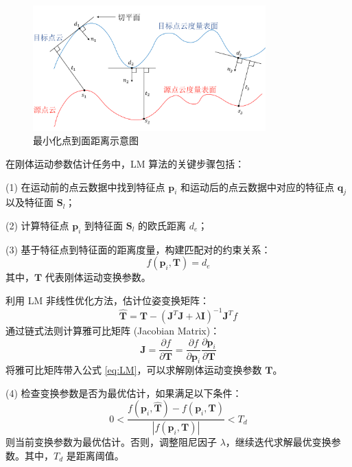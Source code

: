 \begin{figure}[htbp]
    \centering
    \vspace{-0.5cm}
    \includegraphics[width=0.8\textwidth]{images/LM_point2plane.pdf}
    \caption{最小化点到面距离示意图}
    \label{fig:point2plane} 
    \vspace{-1.5cm}
\end{figure}

在刚体运动参数估计任务中，LM 算法的关键步骤包括：

 (1) 在运动前的点云数据中找到特征点 $\boldsymbol{p}_i$ 和运动后的点云数据中对应的特征点 $\boldsymbol{q}_j$ 以及特征面 $\boldsymbol{S}_l$；

 (2) 计算特征点 $\boldsymbol{p}_i$ 到特征面 $\boldsymbol{S}_l$ 的欧氏距离 $d_e$；

 (3) 基于特征点到特征面的距离度量，构建匹配对的约束关系：
\begin{equation}
f(\boldsymbol{p}_i, \boldsymbol{T}) = d_e
\end{equation}
其中，$\boldsymbol{T}$ 代表刚体运动变换参数。

利用 LM 非线性优化方法，估计位姿变换矩阵：
\begin{equation}
\hat{\boldsymbol{T}} = \boldsymbol{T} - (\boldsymbol{J}^T \boldsymbol{J} + \lambda \boldsymbol{I})^{-1} \boldsymbol{J}^T f
\label{eq:LM}
\end{equation}
通过链式法则计算雅可比矩阵 (Jacobian Matrix)：
\begin{equation}
\boldsymbol{J} = \frac{\partial f}{\partial \boldsymbol{T}} = \frac{\partial f}{\partial \boldsymbol{p}_i} \frac{\partial \boldsymbol{p}_i}{\partial \boldsymbol{T}}
\end{equation}
将雅可比矩阵带入公式 \ref{eq:LM}，可以求解刚体运动变换参数 $\boldsymbol{T}$。

 (4) 检查变换参数是否为最优估计，如果满足以下条件：
\begin{equation}
0 < \frac{f(\boldsymbol{p}_i, \hat{\boldsymbol{T}}) - f(\boldsymbol{p}_i, \boldsymbol{T})}{|f(\boldsymbol{p}_i, \boldsymbol{T})|} < T_d
\end{equation}
则当前变换参数为最优估计。否则，调整阻尼因子 $\lambda$，继续迭代求解最优变换参数。其中，$T_d$ 是距离阈值。

